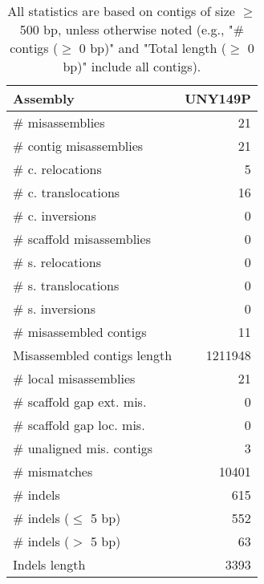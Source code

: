 \documentclass[12pt,a4paper]{article}
\begin{document}
\begin{table}[ht]
\begin{center}
\caption{All statistics are based on contigs of size $\geq$ 500 bp, unless otherwise noted (e.g., "\# contigs ($\geq$ 0 bp)" and "Total length ($\geq$ 0 bp)" include all contigs).}
\begin{tabular}{|l*{1}{|r}|}
\hline
Assembly & UNY149P \\ \hline
\# misassemblies & 21 \\ \hline
\hspace{2mm}\# contig misassemblies & 21 \\ \hline
\hspace{5mm}\# c. relocations & 5 \\ \hline
\hspace{5mm}\# c. translocations & 16 \\ \hline
\hspace{5mm}\# c. inversions & 0 \\ \hline
\hspace{2mm}\# scaffold misassemblies & 0 \\ \hline
\hspace{5mm}\# s. relocations & 0 \\ \hline
\hspace{5mm}\# s. translocations & 0 \\ \hline
\hspace{5mm}\# s. inversions & 0 \\ \hline
\# misassembled contigs & 11 \\ \hline
Misassembled contigs length & 1211948 \\ \hline
\# local misassemblies & 21 \\ \hline
\# scaffold gap ext. mis. & 0 \\ \hline
\# scaffold gap loc. mis. & 0 \\ \hline
\# unaligned mis. contigs & 3 \\ \hline
\# mismatches & 10401 \\ \hline
\# indels & 615 \\ \hline
\hspace{5mm}\# indels ($\leq$ 5 bp) & 552 \\ \hline
\hspace{5mm}\# indels ($>$ 5 bp) & 63 \\ \hline
Indels length & 3393 \\ \hline
\end{tabular}
\end{center}
\end{table}
\end{document}
